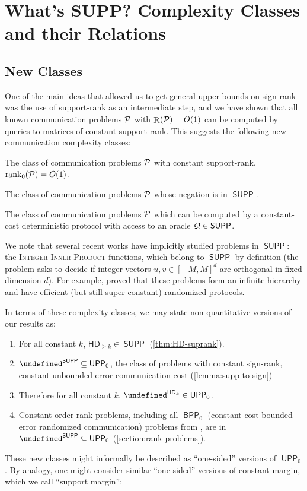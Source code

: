\documentclass{article}
\DeclareMathOperator{\suprank}{rank_0}
\DeclareMathOperator{\Rand}{R}
\newcommand{\cplxclass}[1]{\mathsf{#1}}
\let\P\undefined\DeclareMathOperator{\P}{\cplxclass{P}}
\DeclareMathOperator{\BPP}{\cplxclass{BPP}}
\DeclareMathOperator{\UPP}{\cplxclass{UPP}}
\DeclareMathOperator{\SUPP}{\cplxclass{SUPP}}
\DeclareMathOperator{\coSUPP}{\cplxclass{coSUPP}}
\newcommand{\HD}[1]{\mathsf{HD}_{#1}}
\begin{document}
\section{What's SUPP? Complexity Classes and their Relations}
\label{section:whatsupp}

\subsection{New Classes}
One of the main ideas that allowed us to get general upper bounds on sign-rank
was the use of support-rank as an intermediate step, and we have shown that all
known communication problems $\mathcal{P}$ with $\Rand(\cP) = O(1)$ can be computed by
queries to matrices of constant support-rank. This suggests the following new
communication complexity classes:

\begin{description}[leftmargin=!,labelwidth=1.4cm,labelsep=0.5em]
    \item[$\SUPP$:]
    The class of communication problems $\mathcal{P}$ with constant support-rank,
    $\suprank(\cP) = O(1)$.
    \item[$\coSUPP$:]
    The class of communication problems $\mathcal{P}$ whose negation is in $\SUPP$.
    \item[$\P^{\SUPP}$:]
    The class of communication problems $\mathcal{P}$ which can be computed by
    a constant-cost deterministic protocol with access to an oracle $\cQ \in \SUPP$.
\end{description}

\noindent
We note that several recent works \cite{CLV19,CHHS23,CHHNPS25,Tom25} have implicitly studied problems
in $\SUPP$: the \textsc{Integer Inner Product} functions, which belong to $\SUPP$ by definition (the
problem asks to decide if integer vectors $u, v \in [-M,M]^d$ are orthogonal in fixed dimension
$d$). For example, \cite{CLV19} proved that these problems form an infinite hierarchy and have
efficient (but still super-constant) randomized protocols.

In terms of these complexity classes, we may state non-quantitative versions of our results as:
\begin{enumerate}
    \item For all constant $k$, $\HD{\geq k} \in \SUPP$ (\cref{thm:HD-suprank}).
    \item $\P^{\SUPP} \subseteq \UPP_0$, the class of problems with constant sign-rank,
    \ie constant unbounded-error communication cost (\cref{lemma:supp-to-sign})
    \item Therefore for all constant $k$, $\P^{\HD{k}} \in \UPP_0$.
    \item Constant-order rank problems, including all $\BPP_0$ (constant-cost bounded-error randomized communication) problems from \cite{FGHH25}, are in $\P^{\SUPP} \subseteq \UPP_0$ (\cref{section:rank-problems}).
\end{enumerate}
\noindent
These new classes might informally be described as ``one-sided'' versions of $\UPP_0$.
By analogy, one might consider similar ``one-sided'' versions of constant margin,
which we call ``support margin'':
\end{document}
